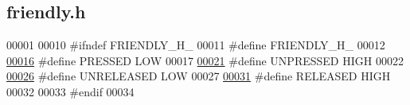 \hypertarget{friendly_8h_source}{}\subsection{friendly.\+h}
\label{friendly_8h_source}

\begin{DoxyCode}
00001 
00010 \textcolor{preprocessor}{#ifndef FRIENDLY\_H\_}
00011 \textcolor{preprocessor}{#define FRIENDLY\_H\_}
00012 
\hypertarget{friendly_8h_source.tex_l00016}{}\hyperlink{friendly_8h_a654adff3c664f27f0b29c24af818dd26}{00016} \textcolor{preprocessor}{#define PRESSED LOW}
00017 
\hypertarget{friendly_8h_source.tex_l00021}{}\hyperlink{friendly_8h_ab165b69b767feb15cba30d2fabcb11cd}{00021} \textcolor{preprocessor}{#define UNPRESSED HIGH}
00022 
\hypertarget{friendly_8h_source.tex_l00026}{}\hyperlink{friendly_8h_a0515f466542f13cfcb0684db1934e193}{00026} \textcolor{preprocessor}{#define UNRELEASED LOW}
00027 
\hypertarget{friendly_8h_source.tex_l00031}{}\hyperlink{friendly_8h_ad74b7f5218b46c8332cd531df7178d45}{00031} \textcolor{preprocessor}{#define RELEASED HIGH}
00032 
00033 \textcolor{preprocessor}{#endif}
00034 
\end{DoxyCode}
